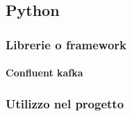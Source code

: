 \subsection{Python}

\subsubsection{Librerie o framework}
\paragraph{Confluent kafka}

\subsubsection{Utilizzo nel progetto}
